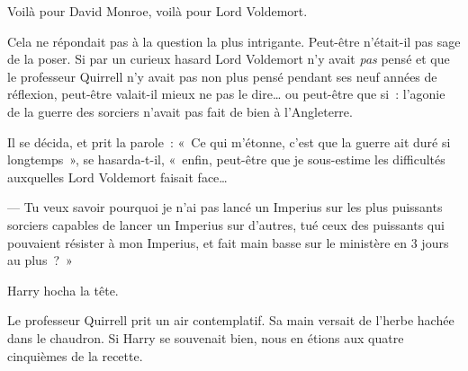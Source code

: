 Voilà pour David Monroe, voilà pour Lord Voldemort.

Cela ne répondait pas à la question la plus intrigante.
Peut-être n'était-il pas sage de la poser.
Si par un curieux hasard Lord Voldemort n'y avait \emph{pas} pensé et que le professeur Quirrell n'y avait pas non plus pensé pendant ses neuf années de réflexion, peut-être valait-il mieux ne pas le dire… ou peut-être que si~: l'agonie de la guerre des sorciers n'avait pas fait de bien à l'Angleterre.

Il se décida, et prit la parole~: «~Ce qui m'étonne, c'est que la guerre ait duré si longtemps~», se hasarda-t-il, «~enfin, peut-être que je sous-estime les difficultés auxquelles Lord Voldemort faisait face…

--- Tu veux savoir pourquoi je n'ai pas lancé un Imperius sur les plus puissants sorciers capables de lancer un Imperius sur d'autres, tué ceux des puissants qui pouvaient résister à mon Imperius, et fait main basse sur le ministère en 3 jours au plus~?~»

Harry hocha la tête.

Le professeur Quirrell prit un air contemplatif.
Sa main versait de l'herbe hachée dans le chaudron.
Si Harry se souvenait bien, nous en étions aux quatre cinquièmes de la recette.


